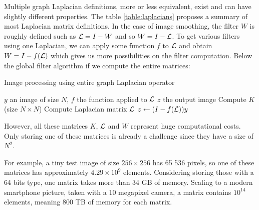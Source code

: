 Multiple graph Laplacian definitions, more or less equivalent, exist and can have slightly different properties.
\ifthesis
The table \ref{table:laplacians} proposes a summary of most Laplacian matrix definitions.
\fi
In the case of image smoothing, the filter \(W\) is roughly defined such as \(\operatorname{\mathcal{L}} = I - W\) \cite{siam_slides_2016} and so \(W = I - \operatorname{\mathcal{L}}\).
To get various filters using one Laplacian, we can apply some function \(f\) to \(\operatorname{\mathcal{L}}\) and obtain \(W = I - f(\operatorname{\mathcal{L}})\) which gives us more possibilities on the filter computation.
Below the global filter algorithm if we compute the entire matrices:

\begin{algorithm}[H]
 \caption{Image processing using entire graph Laplacian operator}
 \begin{algorithmic}
  \REQUIRE \(y\) an image of size \(N\), \(f\) the function applied to \(\operatorname{\mathcal{L}}\)
  \ENSURE \(z\) the output image
  \STATE Compute \(K\) (size \(N \times N\))
  \STATE Compute Laplacian matrix \(\operatorname{\mathcal{L}}\)
  \STATE \(z \leftarrow (I - f(\operatorname{\mathcal{L}})) y\)
 \end{algorithmic}
\end{algorithm}

However, all these matrices \(K\), \(\operatorname{\mathcal{L}}\) and \(W\) represent huge computational costs.
Only storing one of these matrices is already a challenge since they have a size of \(N^2\).

For example, a tiny test image of size \(256 \times 256\) has 65 536 pixels, so one of these matrices has approximately \(4.29 \times 10^9\) elements.
Considering storing those with a 64 bits type, one matrix takes more than 34 GB of memory.
Scaling to a modern smartphone picture, taken with a 10 megapixel camera, a matrix contains \(10^{14}\) elements, meaning 800 TB of memory for each matrix.
